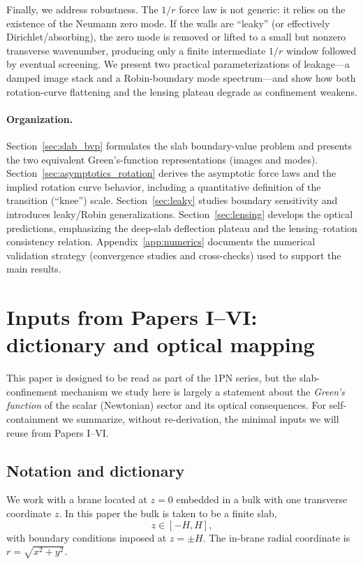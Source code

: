 \documentclass[11pt]{article}
\begin{document}
Finally, we address robustness.
The $1/r$ force law is not generic: it relies on the existence of the Neumann zero mode.
If the walls are ``leaky'' (or effectively Dirichlet/absorbing), the zero mode is removed or lifted
to a small but nonzero transverse wavenumber, producing only a finite intermediate $1/r$ window
followed by eventual screening.
We present two practical parameterizations of leakage---a damped image stack and a Robin-boundary
mode spectrum---and show how both rotation-curve flattening and the lensing plateau degrade as
confinement weakens.

\paragraph{Organization.}
Section~\ref{sec:slab_bvp} formulates the slab boundary-value problem and presents the two equivalent
Green's-function representations (images and modes).
Section~\ref{sec:asymptotics_rotation} derives the asymptotic force laws and the implied rotation
curve behavior, including a quantitative definition of the transition (``knee'') scale.
Section~\ref{sec:leaky} studies boundary sensitivity and introduces leaky/Robin generalizations.
Section~\ref{sec:lensing} develops the optical predictions, emphasizing the deep-slab deflection
plateau and the lensing--rotation consistency relation.
Appendix~\ref{app:numerics} documents the numerical validation strategy (convergence studies and
cross-checks) used to support the main results.

\section{Inputs from Papers I--VI: dictionary and optical mapping}
\label{sec:inputs}

This paper is designed to be read as part of the 1PN series, but the slab-confinement mechanism
we study here is largely a statement about the \emph{Green's function} of the scalar (Newtonian)
sector and its optical consequences.  For self-containment we summarize, without re-derivation,
the minimal inputs we will reuse from Papers I--VI.

\subsection{Notation and dictionary}
We work with a brane located at $z=0$ embedded in a bulk with one transverse coordinate $z$.
In this paper the bulk is taken to be a finite slab,
\begin{equation}
  z \in [-H,H],
\end{equation}
with boundary conditions imposed at $z=\pm H$.
The in-brane radial coordinate is $r = \sqrt{x^2+y^2}$.
\end{document}
